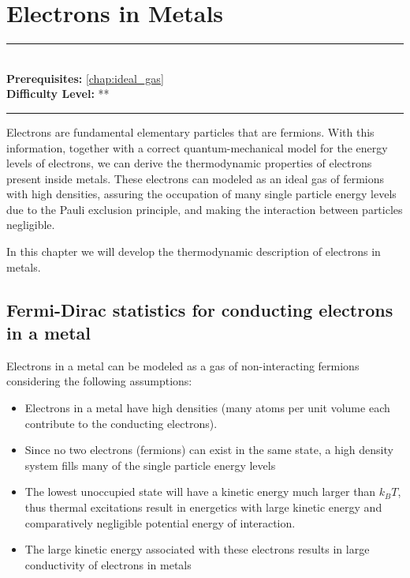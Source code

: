 \documentclass[book.tex]{subfiles}
\begin{document}
\chapter{Electrons in Metals}

\label{chap:electrons_in_metals}
\noindent\rule{11cm}{0.4pt} \\
\textbf{Prerequisites:}  \autoref{chap:ideal_gas}  \\
\textbf{Difficulty Level:} ** \\
\noindent\rule{11cm}{0.4pt}
\vspace{5mm}


Electrons are fundamental elementary particles that are fermions. With this information, together with a correct quantum-mechanical model for the energy levels of electrons, we can derive the thermodynamic properties of electrons present inside metals. These electrons can modeled as an ideal gas of fermions with high densities, assuring the occupation of many single particle energy levels due to the Pauli exclusion principle, and making the interaction between particles negligible.

In this chapter we will develop the thermodynamic description of electrons in metals.


\section{Fermi-Dirac statistics for conducting electrons in a metal}

Electrons in a metal can be modeled as a gas of non-interacting
fermions considering the following assumptions:

\begin{itemize}
\item Electrons in a metal have high densities (many atoms per unit volume each contribute to the conducting electrons).
\item Since no two electrons (fermions) can exist in the same state, a high density system fills many of the single particle energy
levels
\item The lowest unoccupied state will have a kinetic energy much larger than $k_BT$, thus thermal excitations result in energetics
with large kinetic energy and comparatively negligible potential
energy of interaction.
\item The large kinetic energy associated with these electrons results in large conductivity of electrons in metals
\end{itemize}
\end{document}
